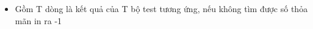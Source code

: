 \begin{itemize}
	\item     Gồm T dòng là kết quả của T bộ test tương ứng, nếu không tìm được số thỏa mãn in ra -1   
\end{itemize}